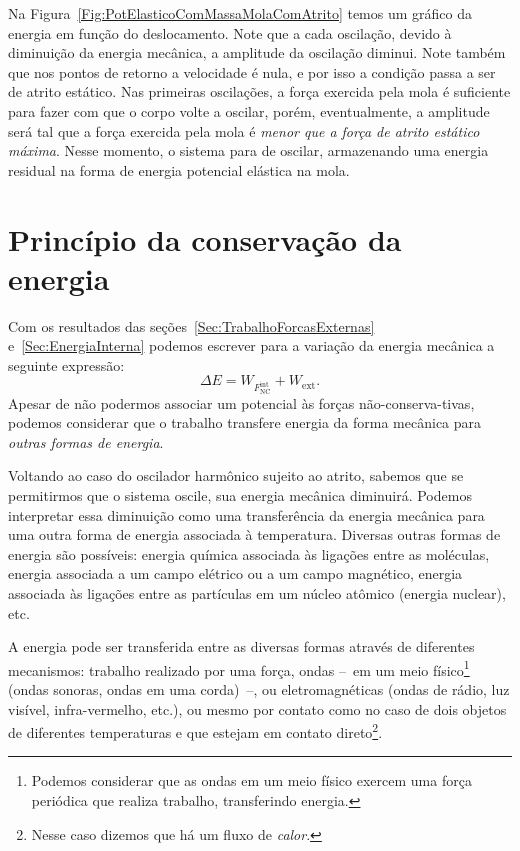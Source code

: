 Na Figura~\ref{Fig:PotElasticoComMassaMolaComAtrito} temos um gráfico da energia em função do deslocamento. Note que a cada oscilação, devido à diminuição da energia mecânica, a amplitude da oscilação diminui. Note também que nos pontos de retorno a velocidade é nula, e por isso a condição passa a ser de atrito estático. Nas primeiras oscilações, a força exercida pela mola é suficiente para fazer com que o corpo volte a oscilar, porém, eventualmente, a amplitude será tal que a força exercida pela mola é \emph{menor que a força de atrito estático máxima}. Nesse momento, o sistema para de oscilar, armazenando uma energia residual na forma de energia potencial elástica na mola.


\section{Princípio da conservação da energia}

Com os resultados das seções~\ref{Sec:TrabalhoForcasExternas} e~\ref{Sec:EnergiaInterna} podemos escrever para a variação da energia mecânica a seguinte expressão:
\begin{equation}
    \Delta E = W_{F_\textrm{NC}^{\textrm{int}}} + W_{\textrm{ext}}.
\end{equation}
%
Apesar de não podermos associar um potencial às forças não-conserva-tivas, podemos considerar que o trabalho transfere energia da forma mecânica para \emph{outras formas de energia}.

Voltando ao caso do oscilador harmônico sujeito ao atrito, sabemos que se permitirmos que o sistema oscile, sua energia mecânica diminuirá. Podemos interpretar essa diminuição como uma transferência da energia mecânica para uma outra forma de energia associada à temperatura. Diversas outras formas de energia são possíveis: energia química associada às ligações entre as moléculas, energia associada a um campo elétrico ou a um campo magnético, energia associada às ligações entre as partículas em um núcleo atômico (energia nuclear), etc.

A energia pode ser transferida entre as diversas formas através de diferentes mecanismos: trabalho realizado por uma força, ondas --~em um meio físico\footnote{Podemos considerar que as ondas em um meio físico exercem uma força periódica que realiza trabalho, transferindo energia.} (ondas sonoras, ondas em uma corda)~--, ou eletromagnéticas (ondas de rádio, luz visível, infra-vermelho, etc.), ou mesmo por contato como no caso de dois objetos de diferentes temperaturas e que estejam em contato direto\footnote{Nesse caso dizemos que há um fluxo de \emph{calor}.}.

